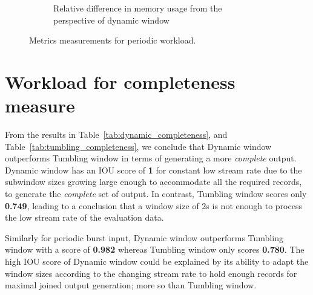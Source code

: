 \begin{figure}
\begin{subfigure}[b]{\textwidth}
        \caption{Relative difference in memory usage from the perspective of dynamic window}
        \label{fig:periodic_mem_diff}
    \end{subfigure}

    \caption{Metrics measurements for periodic workload.}%
    \label{fig:periodic_measurement}
\end{figure}

\newpage
\section{Workload for completeness measure}%
\label{sec:Workload for completeness measure}

From the results in Table~\ref{tab:dynamic_completeness}, and 
Table~\ref{tab:tumbling_completeness}, we conclude that Dynamic window 
outperforms Tumbling window in terms of generating a more \emph{complete} output. 
Dynamic window has an IOU score of \textbf{1} for constant low stream rate
due to the subwindow sizes growing large 
enough to accommodate all the required records, to generate the \emph{complete} set 
of output. In contrast, Tumbling window scores only \textbf{0.749}, leading to 
a conclusion that a window size of 2s is not enough to process the low stream rate 
of the evaluation data. 

Similarly for periodic burst input, Dynamic window outperforms Tumbling window with a
score of \textbf{0.982} whereas Tumbling window only scores \textbf{0.780}. The high IOU 
score of Dynamic window could be explained by its ability to adapt the window sizes according 
to the changing stream rate to hold enough records for maximal joined output generation; more
so than Tumbling window. 


\begin{table}[htbp]
    \centering
\caption{Dynamic window's completeness measurement. The \emph{Expected (triples)} are the number of triples generated by the 
bounded data processing RMLStreamer.}
\label{tab:dynamic_completeness}
\end{table}

